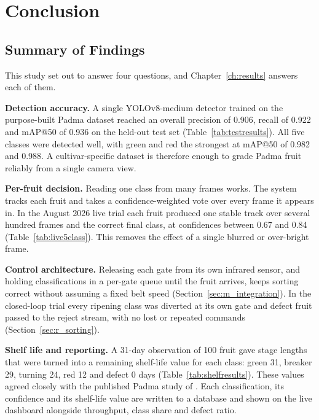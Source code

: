 \section{Conclusion}
\label{ch:conclusions}

\subsection{Summary of Findings}
\label{sec:c_summary}

This study set out to answer four questions, and Chapter~\ref{ch:results} answers each of them.

\textbf{Detection accuracy.} A single YOLOv8-medium detector trained on the purpose-built Padma dataset reached an overall precision of 0.906, recall of 0.922 and mAP@50 of 0.936 on the held-out test set (Table~\ref{tab:testresults}). All five classes were detected well, with green and red the strongest at mAP@50 of 0.982 and 0.988. A cultivar-specific dataset is therefore enough to grade Padma fruit reliably from a single camera view.

\textbf{Per-fruit decision.} Reading one class from many frames works. The system tracks each fruit and takes a confidence-weighted vote over every frame it appears in. In the August 2026 live trial each fruit produced one stable track over several hundred frames and the correct final class, at confidences between 0.67 and 0.84 (Table~\ref{tab:live5class}). This removes the effect of a single blurred or over-bright frame.

\textbf{Control architecture.} Releasing each gate from its own infrared sensor, and holding classifications in a per-gate queue until the fruit arrives, keeps sorting correct without assuming a fixed belt speed (Section~\ref{sec:m_integration}). In the closed-loop trial every ripening class was diverted at its own gate and defect fruit passed to the reject stream, with no lost or repeated commands (Section~\ref{sec:r_sorting}).

\textbf{Shelf life and reporting.} A 31-day observation of 100 fruit gave stage lengths that were turned into a remaining shelf-life value for each class: green 31, breaker 29, turning 24, red 12 and defect 0 days (Table~\ref{tab:shelfresults}). These values agreed closely with the published Padma study of \citet{abekoon2024}. Each classification, its confidence and its shelf-life value are written to a database and shown on the live dashboard alongside throughput, class share and defect ratio.

